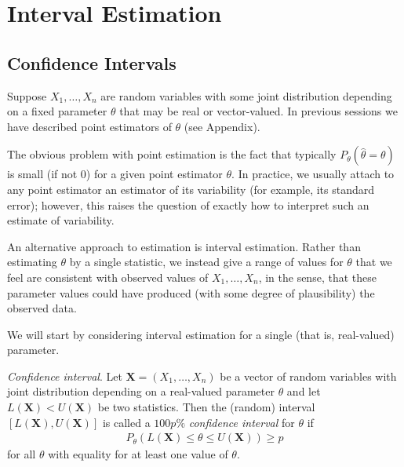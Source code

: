 


\maketitle
\clearpage

\section{Interval Estimation}

\subsection{Confidence Intervals}

Suppose \(X_{1}, \ldots, X_{n}\) are random variables with some joint distribution 
depending on a fixed parameter \(\theta\) that may be real or vector-valued.
In previous sessions we have described point estimators of \(\theta\) (see Appendix).

The obvious problem with point estimation is the fact 
that typically \(P_{\theta}(\widehat{\theta} = \theta)\) is small (if not 0) for a given point estimator \(\theta\).
In practice, 
we usually attach to any point estimator an estimator of its variability (for example, its standard error);
however, 
this raises the question of exactly how to interpret such an estimate of variability.

An alternative approach to estimation is interval estimation.
Rather than estimating \(\theta\) by a single statistic, 
we instead give a range of values for \(\theta\) that we feel are consistent 
with observed values of \(X_{1}, \ldots, X_{n}\), 
in the sense, that these parameter values could have produced (with some degree of plausibility) the observed data.

We will start by considering interval estimation for a single (that is, real-valued) parameter.

\emph{Confidence interval}. 
Let \(\boldsymbol{X}=\left(X_{1}, \ldots, X_{n}\right)\) be a vector of random variables with
joint distribution depending on a real-valued parameter \(\theta\) and
let \(L(\boldsymbol{X}) < U(\boldsymbol{X})\) be two statistics. 
Then the (random) interval \(\left[L(\boldsymbol{X}), U(\boldsymbol{X})\right]\) is 
called a \(100p\%\) \emph{confidence interval} for \(\theta\) if
\begin{align}
P_{\theta} \left(L(\boldsymbol{X}) \leq \theta \leq U(\boldsymbol{X})\right) \geq p
\end{align}
for all \(\theta\) with equality for at least one value of \(\theta\).

